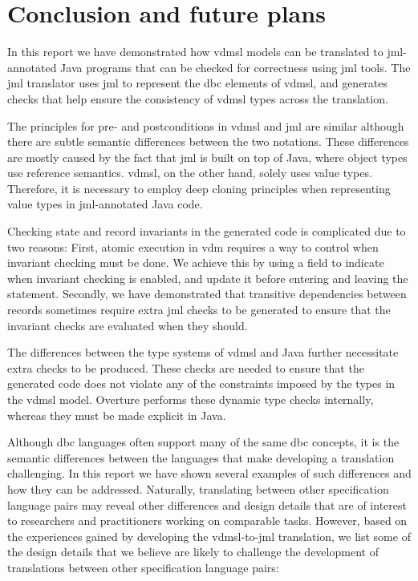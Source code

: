 \section{Conclusion and future plans}
\label{sec:con}

In this report we have demonstrated how \ac{vdmsl} models can be
translated to \ac{jml}-annotated Java programs that can be checked for
correctness using \ac{jml} tools. The \ac{jml} translator uses
\ac{jml} to represent the \ac{dbc} elements of \ac{vdmsl}, and
generates checks that help ensure the consistency of \ac{vdmsl} types
across the translation.

The principles for pre- and postconditions in \ac{vdmsl} and \ac{jml}
are similar although there are subtle semantic differences between the
two notations. These differences are mostly caused by the fact that
\ac{jml} is built on top of Java, where object types use reference
semantics. \ac{vdmsl}, on the other hand, solely uses value
types. Therefore, it is necessary to employ deep cloning principles
when representing value types in \ac{jml}-annotated Java code.

Checking state and record invariants in the generated code is
complicated due to two reasons: First, atomic execution in \ac{vdm}
requires a way to control when invariant checking must be done. We
achieve this by using a  field to indicate when invariant
checking is enabled, and update it before entering and leaving the
 statement. Secondly, we have demonstrated that transitive
dependencies between records sometimes require extra \ac{jml} checks
to be generated to ensure that the invariant checks are evaluated when
they should.

The differences between the type systems of \ac{vdmsl} and Java
further necessitate extra checks to be produced. These checks are
needed to ensure that the generated code does not violate any of the
constraints imposed by the types in the \ac{vdmsl} model. Overture
performs these dynamic type checks internally, whereas they must be
made explicit in Java.

Although \ac{dbc} languages often support many of the same \ac{dbc}
concepts, it is the semantic differences between the languages that
make developing a translation challenging. In this report we have shown
several examples of such differences and how they can be
addressed. Naturally, translating between other specification language
pairs may reveal other differences and design details that are of
interest to researchers and practitioners working on comparable
tasks. However, based on the experiences gained by developing the
\ac{vdmsl}-to-\ac{jml} translation, we list some of the design details
that we believe are likely to challenge the development of
translations between other specification language pairs:

